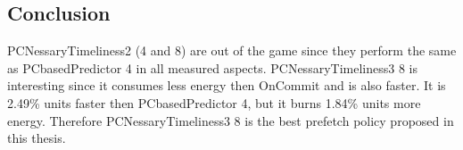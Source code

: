 \subsection{Conclusion}
PCNessaryTimeliness2 (4 and 8) are out of the game since they perform the same as PCbasedPredictor 4 in all measured aspects. PCNessaryTimeliness3 8 is interesting since it consumes less energy then OnCommit and is also faster. It is 2.49\% units
faster then PCbasedPredictor 4, but it burns 1.84\% units more energy. Therefore
PCNessaryTimeliness3 8 is the best prefetch policy proposed in this thesis.


